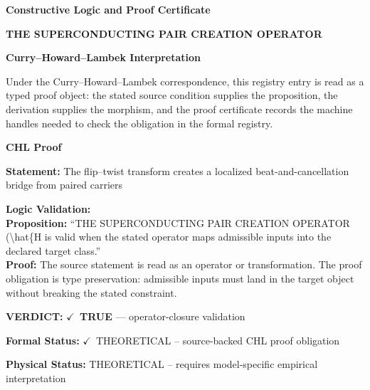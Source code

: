 \clearpage
\begingroup\tzpsupportsetup
\noindent\textbf{\fontsize{10.8pt}{12.8pt}\selectfont [ID 0597] Constructive Logic and Proof Certificate}\par
\noindent\textbf{\fontsize{10pt}{12pt}\selectfont THE SUPERCONDUCTING PAIR CREATION OPERATOR}\par
\vspace{0.45em}
\begingroup
\footnotesize
\setlength{\parskip}{0.22em}
\setlength{\parindent}{0pt}
\noindent\textbf{Curry--Howard--Lambek Interpretation}\par
Under the Curry--Howard--Lambek correspondence, this registry entry is read as a typed proof
object: the stated source condition supplies the proposition, the derivation supplies the
morphism, and the proof certificate records the machine handles needed to check the obligation
in the formal registry.

\vspace{0.45em}
\noindent\textbf{CHL Proof}\par
\textbf{Statement:} The flip--twist transform creates a localized beat-and-cancellation bridge from paired
carriers

\textbf{Logic Validation:}\\
\textbf{Proposition:} ``THE SUPERCONDUCTING PAIR CREATION OPERATOR (\textbackslash{}hat\{H is valid when the stated operator
maps admissible inputs into the declared target class.''\\
\textbf{Proof:} The source statement is read as an operator or transformation. The proof obligation is
type preservation: admissible inputs must land in the target object without breaking the
stated constraint.

\textbf{VERDICT:} \ensuremath{\checkmark}\ \textbf{TRUE} --- operator-closure validation

\textbf{Formal Status:} \ensuremath{\checkmark}\ THEORETICAL -- source-backed CHL proof obligation

\textbf{Physical Status:} THEORETICAL -- requires model-specific empirical interpretation
\par\vspace{0.45em}
\par
\ifTZPDarkEdition
{}
\fi
\endgroup
\endgroup
